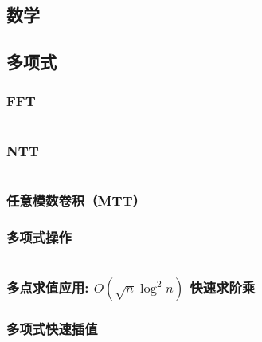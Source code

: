 \documentclass[a4paper, twoside]{article}
\begin{document}
	\begin{multicols}{2}
		\section{数学}
			
			\subsection{多项式}
				\subsubsection{FFT}
					\inputminted{cpp}{../src/math/FFT.cpp}

				\subsubsection{NTT}
					\inputminted{cpp}{../src/math/NTT.cpp}

				\subsubsection{任意模数卷积（MTT）}
					
			
				\subsubsection{多项式操作}
					\label{PolyOperation}
					\inputminted{cpp}{../src/math/多项式操作.cpp}
				
				\subsubsection{多点求值应用: $O(\sqrt n \log^2 n)$ 快速求阶乘}
					\label{fastfact}
					


				\subsubsection{多项式快速插值}
					\label{PolyFastInterpolation}
					


\end{multicols}
\end{document}
